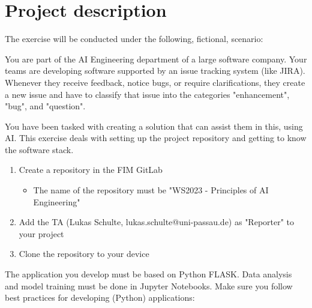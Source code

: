 

\newcommand{\dozenten}{Prof.~Dr.~Steffen Herbold}
\newcommand{\vorlesung}{Principles of AI Engineering}
\newcommand{\docauthor}{Lukas Schulte}
\newcommand{\semester}{}
\newcommand{\blattnummer}{1}
\newcommand{\bistermin}{}



\section*{Project description}

The exercise will be conducted under the following, fictional, scenario:
\vspace{5px}

You are part of the AI Engineering department of a large software company. Your teams are developing software supported by an issue tracking system (like JIRA). Whenever they receive feedback, notice bugs, or require clarifications, they create a new issue and have to classify that issue into the categories "enhancement", "bug", and "question".
\vspace{5px}

You have been tasked with creating a solution that can assist them in this, using AI. This exercise deals with setting up the project repository and getting to know the software stack.

\begin{enumerate}
      \item Create a repository in the FIM GitLab
            \begin{itemize}
                  \item
                        The name of the repository must be "WS2023 - Principles of AI Engineering"
            \end{itemize}
      \item
            Add the TA (Lukas Schulte, lukas.schulte@uni-passau.de) as "Reporter" to your project
      \item Clone the repository to your device
\end{enumerate}

The application you develop must be based on Python FLASK. Data analysis and model training must be done in Jupyter Notebooks. Make sure you follow best practices for developing (Python) applications:

